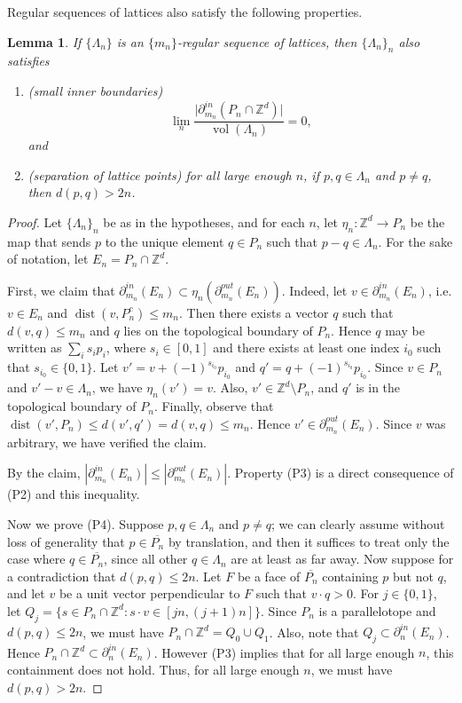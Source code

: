 \documentclass[12pt]{amsart}
\newtheorem{lemma}[theorem]{Lemma}
\theoremstyle{definition}
\DeclareMathOperator{\dist}{dist}
\DeclareMathOperator{\vol}{vol}
\begin{document}
Regular sequences of lattices also satisfy the following properties.
\begin{lemma} \label{Eqn:FDT}
If $\{\Lambda_n\}$ is an $\{m_n\}$-regular sequence of lattices, then $\{\Lambda_n\}_n$ also satisfies
\begin{enumerate}
\item[(P3)] (small inner boundaries)
\begin{equation*}
\lim_n \frac{ \bigl| \partial_{m_n}^{in}(P_n \cap \mathbb{Z}^d) %
\bigr|}{\vol(\Lambda_n)} = 0,
\end{equation*}
and
\item[(P4)] (separation of lattice points)
for all large enough $n$, if $p, q \in \Lambda_n$ and $p \neq q$, then $d(p,q) >2n$.
\end{enumerate}
\end{lemma}
\begin{proof}
Let $\{\Lambda_n\}_n$ be as in the hypotheses, and for each $n$, let $\eta_n : \mathbb{Z}^d \to P_n$ be the map that sends $p$ to the unique element $q \in P_n$ such that $p - q \in \Lambda_n$. For the sake of notation, let $E_n = P_n \cap \mathbb{Z}^d$.

First, we claim that $\partial^{in}_{m_n}(E_n) \subset \eta_n( \partial^{out}_{m_n}(E_n) )$. Indeed, let $v \in \partial^{in}_{m_n}(E_n)$, i.e. $v \in E_n$ and $\dist(v,P_n^c) \leq m_n$. Then there exists a vector $q$ such that $d(v,q) \leq m_n$ and $q$ lies on the topological boundary of $P_n$. Hence $q$ may be written as $\sum_i s_i p_i$, where $s_i \in [0,1]$ and there exists at least one index $i_0$ such that $s_{i_0} \in \{0,1\}$. Let $v' = v+(-1)^{s_{i_0}}p_{i_0}$ and $q' = q+(-1)^{s_{i_0}}p_{i_0}$. Since $v \in P_n$ and $v' - v \in \Lambda_n$, we have $\eta_n(v') = v$. Also, $v' \in \mathbb{Z}^d \setminus P_n$, and $q'$ is in the topological boundary of $P_n$. Finally, observe that $\dist(v',P_n) \leq d(v',q') = d(v,q) \leq m_n$. Hence $v' \in \partial^{out}_{m_n}(E_n)$. Since $v$ was arbitrary, we have verified the claim. 

By the claim, $|\partial^{in}_{m_n}(E_n)| \leq |\partial^{out}_{m_n}(E_n)|$. Property (P3) is a direct consequence of (P2) and this inequality.

Now we prove (P4). Suppose $p,q \in \Lambda_n$ and $p \neq q$; we can clearly assume without loss of generality that $p \in \overline{P_n}$ by translation, and then it suffices to treat only the case where $q \in \overline{P_n}$, since all other $q \in \Lambda_n$ are at least as far away. Now suppose for a contradiction that $d(p,q) \leq 2n$. Let $F$ be a face of $\overline{P_n}$ containing $p$ but not $q$, and let $v$ be a unit vector perpendicular to $F$ such that $v \cdot q >0$. For $j \in \{0,1\}$, let $Q_j = \{ s \in P_n \cap \mathbb{Z}^d : s \cdot v \in [jn,(j+1)n] \}$. Since $P_n$ is a parallelotope and $d(p,q) \leq 2n$, we must have $P_n \cap \mathbb{Z}^d = Q_0 \cup Q_1$. Also, note that $Q_j \subset \partial^{in}_{n}(E_n)$. Hence $P_n \cap \mathbb{Z}^d \subset \partial^{in}_{n}(E_n)$. However (P3) implies that for all large enough $n$, this containment does not hold. Thus, for all large enough $n$, we must have $d(p,q) > 2n$.
\end{proof}
\end{document}
